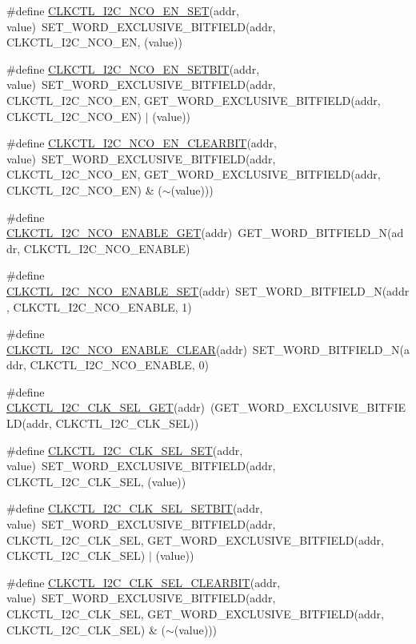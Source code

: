\begin{DoxyCompactItemize}
\item 
\#define \hyperlink{a00544_a0cb99249b9d75cf7064c23acc2a4d7a7}{CLKCTL\_\-I2C\_\-NCO\_\-EN\_\-SET}(addr, value)~SET\_\-WORD\_\-EXCLUSIVE\_\-BITFIELD(addr, CLKCTL\_\-I2C\_\-NCO\_\-EN, (value))
\item 
\#define \hyperlink{a00544_a55d9164a52acb45420bee247e1e6806d}{CLKCTL\_\-I2C\_\-NCO\_\-EN\_\-SETBIT}(addr, value)~SET\_\-WORD\_\-EXCLUSIVE\_\-BITFIELD(addr, CLKCTL\_\-I2C\_\-NCO\_\-EN, GET\_\-WORD\_\-EXCLUSIVE\_\-BITFIELD(addr, CLKCTL\_\-I2C\_\-NCO\_\-EN) $|$ (value))
\item 
\#define \hyperlink{a00544_a4649b1f95e783e35d85f03481c9687ff}{CLKCTL\_\-I2C\_\-NCO\_\-EN\_\-CLEARBIT}(addr, value)~SET\_\-WORD\_\-EXCLUSIVE\_\-BITFIELD(addr, CLKCTL\_\-I2C\_\-NCO\_\-EN, GET\_\-WORD\_\-EXCLUSIVE\_\-BITFIELD(addr, CLKCTL\_\-I2C\_\-NCO\_\-EN) \& ($\sim$(value)))
\item 
\#define \hyperlink{a00544_a595a32ecf5830c979328c4de29cd38d0}{CLKCTL\_\-I2C\_\-NCO\_\-ENABLE\_\-GET}(addr)~GET\_\-WORD\_\-BITFIELD\_\-N(addr, CLKCTL\_\-I2C\_\-NCO\_\-ENABLE)
\item 
\#define \hyperlink{a00544_a12527c8099114ac4a10c2579d67ae00d}{CLKCTL\_\-I2C\_\-NCO\_\-ENABLE\_\-SET}(addr)~SET\_\-WORD\_\-BITFIELD\_\-N(addr, CLKCTL\_\-I2C\_\-NCO\_\-ENABLE, 1)
\item 
\#define \hyperlink{a00544_a898e2f27023a7a8365937edf888fe81c}{CLKCTL\_\-I2C\_\-NCO\_\-ENABLE\_\-CLEAR}(addr)~SET\_\-WORD\_\-BITFIELD\_\-N(addr, CLKCTL\_\-I2C\_\-NCO\_\-ENABLE, 0)
\item 
\#define \hyperlink{a00544_af9d60283a50431a19fbed16394d79f58}{CLKCTL\_\-I2C\_\-CLK\_\-SEL\_\-GET}(addr)~(GET\_\-WORD\_\-EXCLUSIVE\_\-BITFIELD(addr, CLKCTL\_\-I2C\_\-CLK\_\-SEL))
\item 
\#define \hyperlink{a00544_a5798072b73acb121ba7fa8670a40a7ad}{CLKCTL\_\-I2C\_\-CLK\_\-SEL\_\-SET}(addr, value)~SET\_\-WORD\_\-EXCLUSIVE\_\-BITFIELD(addr, CLKCTL\_\-I2C\_\-CLK\_\-SEL, (value))
\item 
\#define \hyperlink{a00544_acb3421ca46c1e903fb04c7bf8a513c7f}{CLKCTL\_\-I2C\_\-CLK\_\-SEL\_\-SETBIT}(addr, value)~SET\_\-WORD\_\-EXCLUSIVE\_\-BITFIELD(addr, CLKCTL\_\-I2C\_\-CLK\_\-SEL, GET\_\-WORD\_\-EXCLUSIVE\_\-BITFIELD(addr, CLKCTL\_\-I2C\_\-CLK\_\-SEL) $|$ (value))
\item 
\#define \hyperlink{a00544_a918776683ef7316d903acce34fa131b4}{CLKCTL\_\-I2C\_\-CLK\_\-SEL\_\-CLEARBIT}(addr, value)~SET\_\-WORD\_\-EXCLUSIVE\_\-BITFIELD(addr, CLKCTL\_\-I2C\_\-CLK\_\-SEL, GET\_\-WORD\_\-EXCLUSIVE\_\-BITFIELD(addr, CLKCTL\_\-I2C\_\-CLK\_\-SEL) \& ($\sim$(value)))

\end{DoxyCompactItemize}
